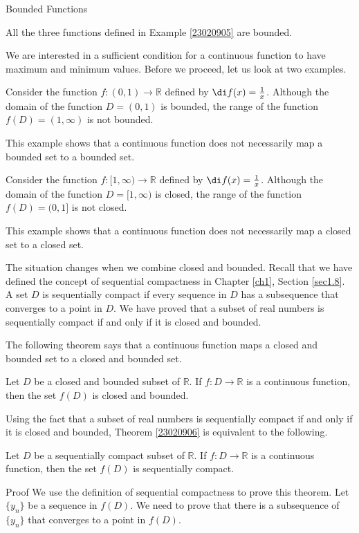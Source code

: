 \begin{example}
\begin{definition}{Bounded Functions}
\end{definition}

\begin{example}{}
All the three functions defined in Example \ref{23020905} are  bounded.
\end{example}



We are interested in a sufficient condition for a continuous function to have maximum and minimum values. Before we proceed, let us look at two examples.
 
 
  \begin{example}{}
 Consider the function $f:(0,1)\rightarrow\mathbb{R}$ defined by $\di f(x)=\frac{1}{x}$. Although the domain of the function $D=(0,1)$ is bounded, the range of the function $f(D)=(1, \infty)$ is not bounded.
 \end{example}
 This example shows that a continuous function does not necessarily map a bounded set to a bounded set. 
 
 
  \begin{example}{}
 Consider the function $f:[1,\infty)\rightarrow\mathbb{R}$ defined by $\di f(x)=\frac{1}{x}$. Although the domain of the function $D=[1, \infty)$ is closed, the range of the function $f(D)=(0, 1]$ is not closed.
 \end{example}
 This example shows that a continuous function does not necessarily map a closed set to a closed set. 
  
   The situation changes   when we combine closed and bounded.
 Recall that we have defined the concept of sequential compactness in Chapter \ref{ch1}, Section \ref{sec1.8}. A set $D$ is sequentially compact if    every sequence in $D$ has a subsequence that converges to a point in $D$. We have proved that a subset of real numbers is sequentially compact if and only if it is closed and bounded.
 

  The following theorem says that a continuous function maps a  closed and bounded set to a closed and bounded set.
 
  \begin{theorem}[label=23020906]{}
  Let $D$ be a closed and bounded subset of $\mathbb{R}$. If $f:D\rightarrow \mathbb{R}$ is  a continuous function, then the set $f(D)$ is   closed and bounded.
  \end{theorem}
  Using the fact that a subset of real numbers is sequentially compact if and only if it is closed and bounded, Theorem \ref{23020906} is equivalent to the following.
  \begin{theorem}
  [label=23020607]{}
  Let $D$ be a sequentially compact subset of $\mathbb{R}$. If $f:D\rightarrow \mathbb{R}$ is  a continuous function, then the set $f(D)$ is sequentially compact.
  \end{theorem}
  \begin{myproof}{Proof}
  We use the definition of sequential compactness to prove this theorem.  Let $\{y_n\}$ be a sequence in $f(D)$. We need to prove that there is a subsequence of $\{y_n\}$ that converges to a point in $f(D)$. 
  

\end{myproof}
\end{example}
